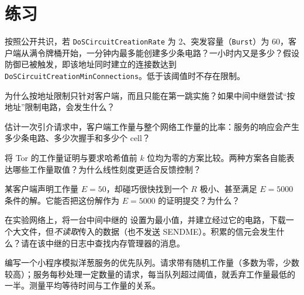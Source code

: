 \section*{练习}

\begin{esercizio}[1]\label{es:15-bucket}
按照公开共识，若 \texttt{DoSCircuitCreationRate} 为 2、突发容量（\texttt{Burst}）为 60，客户端从满令牌桶开始，一分钟内最多能创建多少条电路？一小时内又是多少？假设防御已被触发，即该地址同时建立的连接数达到 \texttt{DoSCircuitCreationMinConnections}。低于该阈值时不存在限制。
\end{esercizio}

\begin{esercizio}[1]\label{es:15-guard}
为什么按地址限制只针对客户端，而且只能在第一跳实施？如果中间中继尝试\enquote{按地址}限制电路，会发生什么？
\end{esercizio}

\begin{esercizio}[2]\label{es:15-amplificazione}
估计一次引介请求中，客户端工作量与整个网络工作量的比率：服务的响应会产生多少条电路、多少次握手和多少个 cell？
\end{esercizio}

\begin{esercizio}[2]\label{es:15-bit}
将 Tor 的工作量证明与要求哈希值前 $k$ 位均为零的方案比较。两种方案各自能表达哪些工作量取值？为什么线性刻度更适合反馈控制？
\end{esercizio}

\begin{esercizio}[2]\label{es:15-sforzo}
某客户端声明工作量 $E = 50$，却碰巧很快找到一个 $R$ 极小、甚至满足 $E = 5000$ 条件的解。它能否把这份解作为 $E = 5000$ 的证明提交？为什么？
\end{esercizio}

\begin{esercizio}[3]\label{es:15-oom}
在实验网络上，将一台中间中继的  设置为最小值，并建立经过它的电路，下载一个大文件，但\emph{不读取}传入的数据（也不发送 SENDME）。积累的信元会发生什么？请在该中继的日志中查找内存管理器的消息。
\end{esercizio}

\begin{esercizio}[3]\label{es:15-coda}
编写一个小程序模拟洋葱服务的优先队列。请求带有随机工作量（多数为零，少数较高）；服务每秒处理一定数量的请求，每当队列超过阈值，就丢弃工作量最低的一半。测量平均等待时间与工作量的关系。
\end{esercizio}

